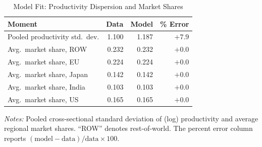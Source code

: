 \documentclass[12pt]{article}
\begin{document}
\begin{table}[htbp]
\centering
\small
\caption{Model Fit: Productivity Dispersion and Market Shares}
\label{tab:moment_fit_prod_shares}
\begin{tabular}{lrrr}
\toprule
Moment & Data & Model & \% Error \\
\midrule
Pooled productivity std.\ dev. & 1.100 & 1.187 & $+7.9$ \\
\addlinespace
Avg.\ market share, ROW & 0.232 & 0.232 & $+0.0$ \\
Avg.\ market share, EU & 0.224 & 0.224 & $+0.0$ \\
Avg.\ market share, Japan & 0.142 & 0.142 & $+0.0$ \\
Avg.\ market share, India & 0.103 & 0.103 & $+0.0$ \\
Avg.\ market share, US & 0.165 & 0.165 & $+0.0$ \\
\bottomrule
\end{tabular}
\begin{minipage}{0.85\textwidth}
\footnotesize
\vspace{0.5em}
\textit{Notes:} Pooled cross-sectional standard deviation of (log) productivity and average regional market shares. ``ROW'' denotes rest-of-world. The percent error column reports $(\text{model} - \text{data})/\text{data} \times 100$.
\end{minipage}
\end{table}
\end{document}
